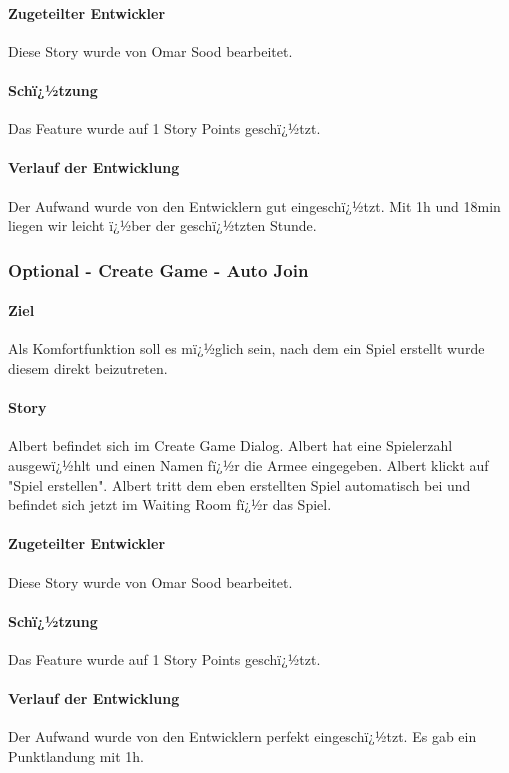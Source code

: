 \documentclass[12pt, titlepage]{scrartcl}
\begin{document}
			\paragraph{Zugeteilter Entwickler} Diese Story wurde von Omar Sood bearbeitet.
			\paragraph{Schï¿½tzung}
			Das Feature wurde auf 1 Story Points geschï¿½tzt.
			\paragraph{Verlauf der Entwicklung} 
			Der Aufwand wurde von den Entwicklern gut eingeschï¿½tzt. Mit 1h und 18min liegen wir leicht ï¿½ber der geschï¿½tzten Stunde.
			
			\subsubsection{Optional - Create Game - Auto Join}
			\paragraph{Ziel} Als Komfortfunktion soll es mï¿½glich sein, nach dem ein Spiel erstellt wurde diesem direkt beizutreten.
			\paragraph{Story} Albert befindet sich im Create Game Dialog. Albert hat eine Spielerzahl ausgewï¿½hlt und einen Namen fï¿½r die Armee eingegeben. Albert klickt auf "Spiel erstellen". Albert tritt dem eben erstellten Spiel automatisch bei und befindet sich jetzt im Waiting Room fï¿½r das Spiel.
			\paragraph{Zugeteilter Entwickler} Diese Story wurde von Omar Sood bearbeitet.
			\paragraph{Schï¿½tzung}
			Das Feature wurde auf 1 Story Points geschï¿½tzt.
			\paragraph{Verlauf der Entwicklung} 
			Der Aufwand wurde von den Entwicklern perfekt eingeschï¿½tzt. Es gab ein Punktlandung mit 1h. 
			
\end{document}
